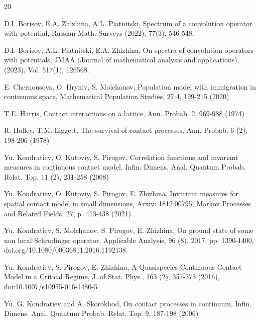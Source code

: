 \documentclass[a4paper,12pt]{article}
\begin{document}
\begin{thebibliography}{20}

 D.I. Borisov, E.A. Zhizhina, A.L. Piatnitski, Spectrum of a convolution operator with potential, Russian Math. Surveys (2022), 77(3), 546-548.

 D.I. Borisov, A.L. Piatnitski, E.A. Zhizhina, On spectra of convolution operators with potentials, JMAA (Journal of mathematical analysis and applications), (2023), Vol. 517(1), 126568.

 E. Chernousova, O. Hryniv, S. Molchanov, Population model with immigration in continuous space,
Mathematical Population Studies, 27:4, 199-215 (2020).

 T.E. Harris, Contact interactions on a lattice, Ann. Probab. 2, 969-988 (1974)

 R. Holley, T.M. Liggett, The survival of contact processes, Ann. Probab. 6 (2), 198-206 (1978)



 Yu. Kondratiev, O. Kutoviy, S. Pirogov, Correlation functions
and invariant measures in continuous contact model, Infin. Dimens. Anal. Quantum Probab. Relat. Top.
11 (2), 231-258 (2008)

 Yu. Kondratiev, O. Kutoviy, S. Pirogov, E. Zhizhina, Invariant measures for spatial contact model in small dimensions, Arxiv: 1812.00795, Markov Processes and Related Fields, 27, p. 413-438 (2021).


 Yu. Kondratiev, S. Molchanov, S. Pirogov, E. Zhizhina, On ground state of some non local Schrodinger operator, Applicable Analysis, 96 (8), 2017,  pp. 1390-1400, doi.org/10.1080/00036811.2016.1192138.

 Yu. Kondratiev, S. Pirogov, E. Zhizhina, A Quasispecies Continuous Contact Model
in a Critical Regime, J. of Stat. Phys., 163 (2), 357-373 (2016), doi:10.1007/s10955-016-1480-5


 Yu. G. Kondratiev and A. Skorokhod, On contact processes in continuum,
Infin. Dimens. Anal. Quantum Probab. Relat. Top. 9, 187-198 (2006)


\end{thebibliography}
\end{document}
